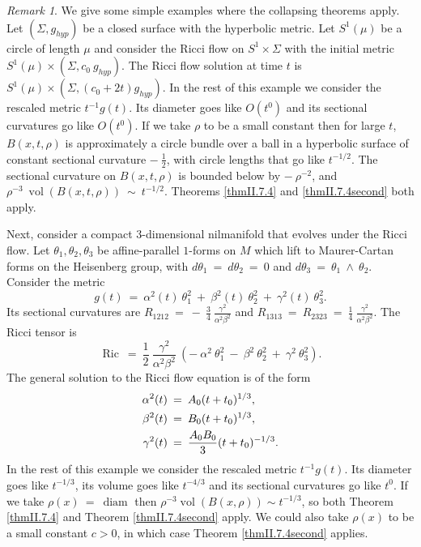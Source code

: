 \documentclass[12pt]{amsart}
\newcommand{\diam}{\operatorname{diam}}
\newcommand{\Ric}{\operatorname{Ric}}
\newcommand{\vol}{\operatorname{vol}}
\numberwithin{equation}{section}
\theoremstyle{plain}
\theoremstyle{definition}
\theoremstyle{remark}
\newtheorem{remark}[equation]{Remark}
\begin{document}
\begin{remark}
We give some simple examples where the collapsing theorems apply.
Let $(\Sigma, g_{hyp})$ be a closed surface with the hyperbolic
metric.  Let $S^1(\mu)$ be a circle of length $\mu$ and consider
the Ricci flow on $S^1 \times \Sigma$ with the initial metric
$S^1(\mu) \times (\Sigma, c_0 \: g_{hyp})$. The Ricci flow solution at
time $t$ is $S^1(\mu) \times (\Sigma, (c_0 + 2t) g_{hyp})$.
In the rest of this example we consider 
the rescaled metric $t^{-1} g(t)$.
Its diameter goes like
$O(t^0)$ and its sectional curvatures  go like $O(t^0)$. If we
take $\rho$ to be a small constant then for large $t$,
$B(x, t, \rho)$ is approximately a circle bundle over a ball in a hyperbolic surface
of constant sectional curvature $- \: \frac12$, with circle lengths
that go like $t^{-1/2}$. The sectional curvature on 
$B(x, t, \rho)$ is bounded below by $- \: \rho^{-2}$, and
$\rho^{-3} \: \vol(B(x, t, \rho)) \: \sim \: t^{-1/2}$.
Theorems \ref{thmII.7.4}
and \ref{thmII.7.4second} both apply.

Next, consider a compact
$3$-dimensional nilmanifold that evolves under the Ricci flow.
Let $\theta_1, \theta_2, \theta_3$ be affine-parallel $1$-forms on $M$
which lift to Maurer-Cartan forms on the Heisenberg group, with
$d\theta_1 \: = \: d\theta_2 \: = \: 0$ and $d\theta_3 \: = \:
\theta_1 \: \wedge \: \theta_2$.
Consider the metric
\begin{equation}
g(t) \: = \: \alpha^2(t) \: \theta_1^2 \: + \: 
\beta^2(t) \: \theta_2^2 \: + \: 
\gamma^2(t) \: \theta_3^2.
\end{equation}
Its sectional curvatures are
$R_{1212} \: = \: - \: \frac34 \: \frac{\gamma^2}{\alpha^2 \beta^2}$ and
$R_{1313} \: = \: R_{2323}
\: = \: \frac14 \: \frac{\gamma^2}{\alpha^2 \beta^2}$.
The Ricci tensor is
\begin{equation}
\Ric \: = \: \frac12 \: \frac{\gamma^2}{\alpha^2 \beta^2} \:
\left( - \: \alpha^2 \: \theta_1^2 \: - \: \beta^2 \: \theta_2^2 \: 
+ \: \gamma^2 \: \theta_3^2 \right).
\end{equation}
The general solution to the Ricci flow equation is of the form
\begin{align}
\alpha^2(t) \: & = \: A_0 (t + t_0)^{1/3}, \\
\beta^2(t) \: & = \: B_0 (t + t_0)^{1/3}, \notag \\
\gamma^2(t) \: & = \: \frac{A_0 B_0}{3} (t + t_0)^{-1/3}. \notag
\end{align}
In the rest of this example we consider 
the rescaled metric $t^{-1} g(t)$. 
Its diameter goes like
$t^{-1/3}$, its volume goes like $t^{-4/3}$
and its sectional curvatures
go like $t^0$. If we take
$\rho(x) \: = \: \diam$ then 
$\rho^{-3} \vol(B(x, \rho)) \sim t^{-1/3}$, so both Theorem \ref{thmII.7.4}
and Theorem \ref{thmII.7.4second} apply.
We could also take $\rho(x)$ to be a small constant
$c > 0$, in which case Theorem \ref{thmII.7.4second} applies.



\end{remark}
\end{document}
